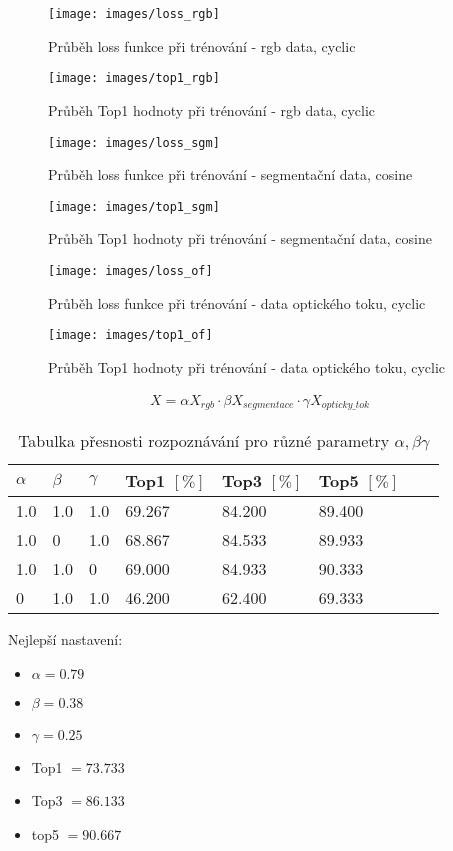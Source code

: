 \documentclass[11pt]{article}
\begin{document}
\begin{figure}[h!]
\centering
\texttt{[image: images/loss\_rgb]}
\caption{Průběh loss funkce při trénování - rgb data, cyclic}
\endminipage
{}
\centering
\texttt{[image: images/top1\_rgb]}
\caption{Průběh Top1 hodnoty při trénování - rgb data, cyclic}
\endminipage
\end{figure}


\begin{figure}[h!]
\centering
\texttt{[image: images/loss\_sgm]}
\caption{Průběh loss funkce při trénování - segmentační data, cosine}
\endminipage
{}
\centering
\texttt{[image: images/top1\_sgm]}
\caption{Průběh Top1 hodnoty při trénování - segmentační data, cosine}
\endminipage
\end{figure}

\begin{figure}[h!]
\centering
\texttt{[image: images/loss\_of]}
\caption{Průběh loss funkce při trénování - data optického toku, cyclic}
\endminipage
{}
\centering
\texttt{[image: images/top1\_of]}
\caption{Průběh Top1 hodnoty při trénování - data optického toku, cyclic}
\endminipage
\end{figure}


\newpage


\begin{align}
X = \alpha X_{rgb} \cdot \beta X_{segmentace} \cdot \gamma X_{opticky\_tok}
\end{align}

\begin{table}[hbpt!]
\begin{tabular}{|l|l|l|l|l|l|l|l|}
\hline
$\alpha$ & $\beta$ & $\gamma$ & Top1 $[\%]$ & Top3 $[\%]$ & Top5 $[\%]$\\ \hline
1.0 & 1.0 & 1.0  & 69.267 & 84.200 & 89.400 \\ \hline
1.0 & 0 & 1.0  & 68.867 & 84.533 & 89.933 \\ \hline
1.0 & 1.0 & 0  & 69.000 & 84.933 & 90.333 \\ \hline
0 & 1.0 & 1.0  & 46.200 & 62.400 & 69.333 \\ \hline
\end{tabular}
    \caption{Tabulka přesnosti rozpoznávání pro různé parametry $\alpha, \beta \gamma$}
    \label{tab:top_tab2}
\end{table}

Nejlepší nastavení:
\begin{itemize}
\item $\alpha = 0.79 $
\item $\beta = 0.38$
\item $\gamma = 0.25$
\item Top1 $= 73.733$
\item Top3 $= 86.133$
\item top5 $= 90.667$ 
\end{itemize}

\newpage

\printbibliography
\end{document}
